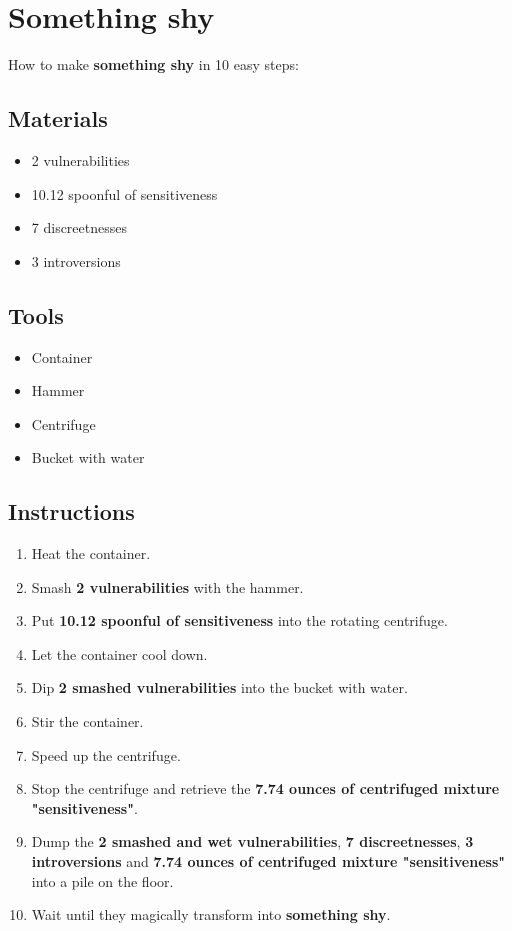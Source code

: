 \documentclass{article}
\begin{document}
\section{Something shy}How to make \textbf{something shy} in 10 easy steps:

\subsection{Materials}\begin{itemize}
\item 
2 vulnerabilities
\item 
10.12 spoonful of sensitiveness
\item 
7 discreetnesses
\item 
3 introversions
\end{itemize}
\subsection{Tools}\begin{itemize}
\item 
Container
\item 
Hammer
\item 
Centrifuge
\item 
Bucket with water
\end{itemize}
\subsection{Instructions}\begin{enumerate}
\item 
Heat the container.
\item 
Smash \textbf{2 vulnerabilities} with the hammer.
\item 
Put \textbf{10.12 spoonful of sensitiveness} into the rotating centrifuge.
\item 
Let the container cool down.
\item 
Dip \textbf{2 smashed vulnerabilities} into the bucket with water.
\item 
Stir the container.
\item 
Speed up the centrifuge.
\item 
Stop the centrifuge and retrieve the \textbf{7.74 ounces of centrifuged mixture "sensitiveness"}.
\item 
Dump the \textbf{2 smashed and wet vulnerabilities}, \textbf{7 discreetnesses}, \textbf{3 introversions} and \textbf{7.74 ounces of centrifuged mixture "sensitiveness"} into a pile on the floor.
\item 
Wait until they magically transform into \textbf{something shy}.
\end{enumerate}
\newpage
\end{document}
